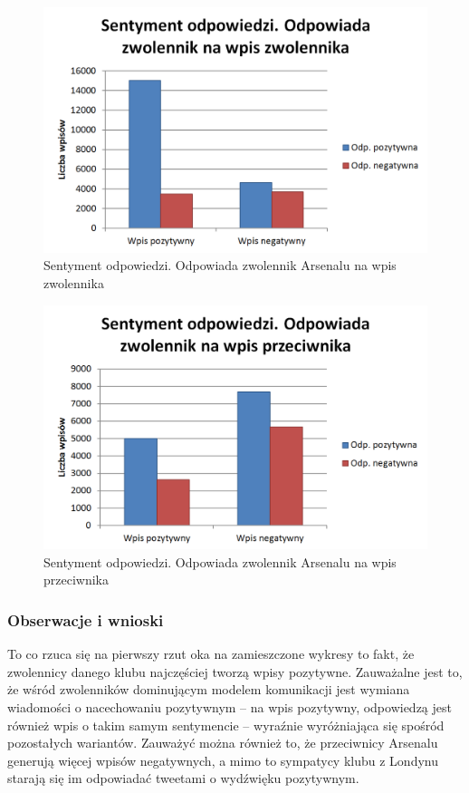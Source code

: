 \begin{figure}[ht!]
\centering
\includegraphics[width=140mm]{img/reply-sentiment-zwolennik-zwolennik.png}
\caption{Sentyment odpowiedzi. Odpowiada zwolennik Arsenalu na wpis zwolennika}
\label{image:reply-sentiment-zwolennik-zwolennik}
\end{figure}

\clearpage

\begin{figure}[ht!]
\centering
\includegraphics[width=140mm]{img/reply-sentiment-zwolennik-przeciwnik.png}
\caption{Sentyment odpowiedzi. Odpowiada zwolennik Arsenalu na wpis przeciwnika}
\label{image:reply-sentiment-zwolennik-przeciwnik}
\end{figure}

\subsubsection{Obserwacje i wnioski}
To co rzuca się na pierwszy rzut oka na zamieszczone wykresy to fakt, że 
zwolennicy danego klubu najczęściej tworzą wpisy pozytywne. Zauważalne jest to,
że wśród zwolenników dominującym modelem komunikacji jest wymiana wiadomości
o nacechowaniu pozytywnym -- na wpis pozytywny, odpowiedzą jest również wpis o 
takim samym sentymencie -- wyraźnie wyróżniająca się spośród pozostałych
wariantów.
Zauważyć można również to, że przeciwnicy Arsenalu generują więcej wpisów 
negatywnych, a mimo to sympatycy klubu z Londynu starają się im odpowiadać
tweetami o wydźwięku pozytywnym.

